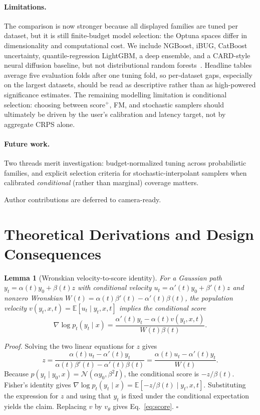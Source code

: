 \documentclass{uai2026}
\newcommand{\E}{\mathbb{E}}
\newcommand{\Norm}{\mathcal{N}}
\newtheorem{lemma}{Lemma}
\begin{document}
\paragraph{Limitations.} The comparison is now stronger because all displayed families are tuned per dataset, but it is still finite-budget model selection: the Optuna spaces differ in dimensionality and computational cost. We include NGBoost, iBUG, CatBoost uncertainty, quantile-regression LightGBM, a deep ensemble, and a CARD-style neural diffusion baseline, but not distributional random forests~\citep{cevid2022drf}. Headline tables average five evaluation folds after one tuning fold, so per-dataset gaps, especially on the largest datasets, should be read as descriptive rather than as high-powered significance estimates. The remaining modelling limitation is conditional selection: choosing between score$^+$, FM, and stochastic samplers should ultimately be driven by the user's calibration and latency target, not by aggregate CRPS alone.

\paragraph{Future work.} Two threads merit investigation: budget-normalized tuning across probabilistic families, and explicit selection criteria for stochastic-interpolant samplers when calibrated \emph{conditional} (rather than marginal) coverage matters.

\begin{contributions}
Author contributions are deferred to camera-ready.
\end{contributions}



\appendix
\onecolumn

\section{Theoretical Derivations and Design Consequences}\label{app:theory}

\begin{lemma}[Wronskian velocity-to-score identity]\label{lem:wronskian-score}
For a Gaussian path $y_t=\alpha(t)y_0+\beta(t)z$ with conditional velocity $u_t=\alpha'(t)y_0+\beta'(t)z$ and nonzero Wronskian $W(t)=\alpha(t)\beta'(t)-\alpha'(t)\beta(t)$, the population velocity $v(y_t,x,t)=\E[u_t\mid y_t,x,t]$ implies the conditional score
\[
\nabla \log p_t(y_t\mid x)=\frac{\alpha'(t)y_t-\alpha(t)v(y_t,x,t)}{W(t)\beta(t)}.
\]
\end{lemma}
\emph{Proof.} Solving the two linear equations for $z$ gives
\[
z=\frac{\alpha(t)u_t-\alpha'(t)y_t}{\alpha(t)\beta'(t)-\alpha'(t)\beta(t)}
  =\frac{\alpha(t)u_t-\alpha'(t)y_t}{W(t)}.
\]
Because $p(y_t\mid y_0,x)=\Norm(\alpha y_0,\beta^2 I)$, the conditional score is $-z/\beta(t)$. Fisher's identity gives $\nabla\log p_t(y_t\mid x)=\E[-z/\beta(t)\mid y_t,x,t]$. Substituting the expression for $z$ and using that $y_t$ is fixed under the conditional expectation yields the claim. Replacing $v$ by $v_\theta$ gives Eq.~\eqref{eq:score}. \hfill$\square$
\end{document}
